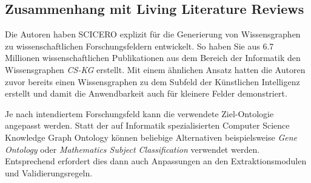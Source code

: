 \subsection{Zusammenhang mit Living Literature Reviews}

Die Autoren haben SCICERO explizit für die Generierung von Wissensgraphen zu wissenschaftlichen Forschungsfeldern entwickelt.
So haben Sie aus 6.7 Millionen wissenschaftlichen Publikationen aus dem Bereich der Informatik den Wissensgraphen \textit{CS-KG} \cite{cskg} erstellt.
Mit einem ähnlichen Ansatz hatten die Autoren zuvor bereits einen Wissensgraphen zu dem Subfeld der Künstlichen Intelligenz erstellt \cite{aikg} und damit die Anwendbarkeit auch für kleinere Felder demonstriert.

Je nach intendiertem Forschungsfeld kann die verwendete Ziel-Ontologie angepasst werden.
Statt der auf Informatik spezialisierten Computer Science Knowledge Graph Ontology können beliebige Alternativen \textemdash beispielsweise \textit{Gene Ontology} oder \textit{Mathematics Subject Classification} \cite{DESSI2022109945} \textemdash verwendet werden.
Entsprechend erfordert dies dann auch Anpassungen an den Extraktionsmodulen und Validierungsregeln.

